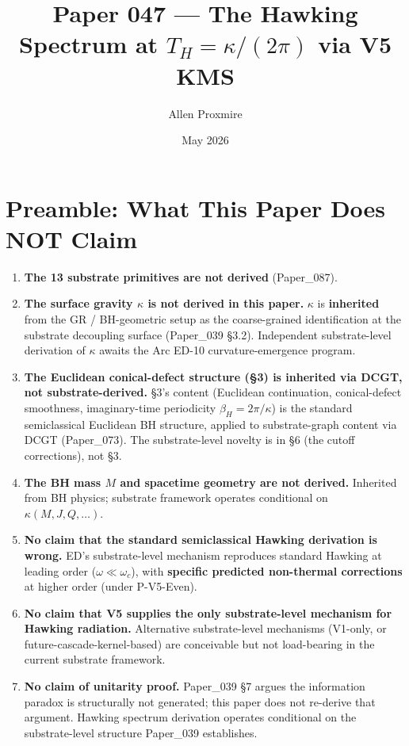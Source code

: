 \documentclass[11pt,a4paper]{article}
\title{\vspace{-1cm}\Large\bfseries Paper 047 --- The Hawking Spectrum at $T_H = \kappa/(2\pi)$ via V5 KMS}
\author{Allen Proxmire}
\date{May 2026}
\begin{document}
\maketitle

\section*{Preamble: What This Paper Does NOT Claim}

\begin{enumerate}[noitemsep]
\item \textbf{The 13 substrate primitives are not derived} (Paper\_087).
\item \textbf{The surface gravity $\kappa$ is not derived in this paper.} $\kappa$ is \textbf{inherited} from the GR / BH-geometric setup as the coarse-grained identification at the substrate decoupling surface (Paper\_039 \S3.2). Independent substrate-level derivation of $\kappa$ awaits the Arc ED-10 curvature-emergence program.
\item \textbf{The Euclidean conical-defect structure (\S3) is inherited via DCGT, not substrate-derived.} \S3's content (Euclidean continuation, conical-defect smoothness, imaginary-time periodicity $\beta_H = 2\pi/\kappa$) is the standard semiclassical Euclidean BH structure, applied to substrate-graph content via DCGT (Paper\_073). The substrate-level novelty is in \S6 (the cutoff corrections), not \S3.
\item \textbf{The BH mass $M$ and spacetime geometry are not derived.} Inherited from BH physics; substrate framework operates conditional on $\kappa(M, J, Q, \ldots)$.
\item \textbf{No claim that the standard semiclassical Hawking derivation is wrong.} ED's substrate-level mechanism reproduces standard Hawking at leading order ($\omega \ll \omega_c$), with \textbf{specific predicted non-thermal corrections} at higher order (under P-V5-Even).
\item \textbf{No claim that V5 supplies the only substrate-level mechanism for Hawking radiation.} Alternative substrate-level mechanisms (V1-only, or future-cascade-kernel-based) are conceivable but not load-bearing in the current substrate framework.
\item \textbf{No claim of unitarity proof.} Paper\_039 \S7 argues the information paradox is structurally not generated; this paper does not re-derive that argument. Hawking spectrum derivation operates conditional on the substrate-level structure Paper\_039 establishes.

\end{enumerate}
\end{document}

